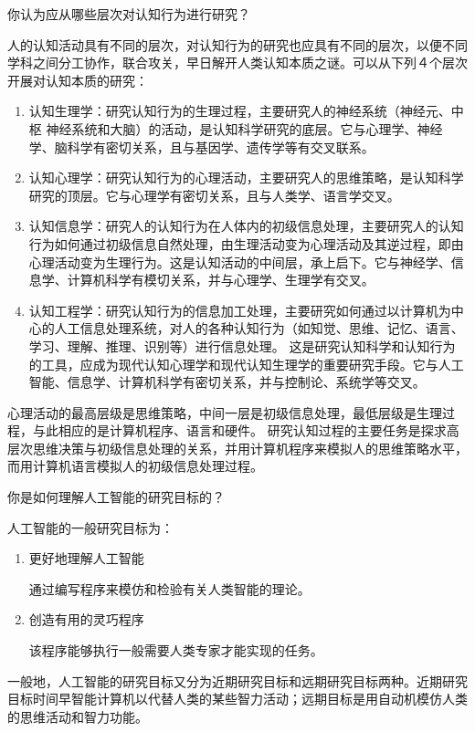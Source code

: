 \begin{question}
你认为应从哪些层次对认知行为进行研究？
\end{question}
\begin{solution}
人的认知活动具有不同的层次，对认知行为的研究也应具有不同的层次，以便不同学科之间分工协作，联合攻关，早日解开人类认知本质之谜。可以从下列４个层次开展对认知本质的研究： 
	\begin{enumerate}
		\item 认知生理学：研究认知行为的生理过程，主要研究人的神经系统（神经元、中枢 神经系统和大脑）的活动，是认知科学研究的底层。它与心理学、神经学、脑科学有密切关系，且与基因学、遗传学等有交叉联系。
		\item 认知心理学：研究认知行为的心理活动，主要研究人的思维策略，是认知科学研究的顶层。它与心理学有密切关系，且与人类学、语言学交叉。
		\item 认知信息学：研究人的认知行为在人体内的初级信息处理，主要研究人的认知行为如何通过初级信息自然处理，由生理活动变为心理活动及其逆过程，即由心理活动变为生理行为。这是认知活动的中间层，承上启下。它与神经学、信息学、计算机科学有模切关系，并与心理学、生理学有交叉。
		\item 认知工程学：研究认知行为的信息加工处理，主要研究如何通过以计算机为中心的人工信息处理系统，对人的各种认知行为（如知觉、思维、记忆、语言、学习、理解、推理、识别等）进行信息处理。 这是研究认知科学和认知行为的工具，应成为现代认知心理学和现代认知生理学的重要研究手段。它与人工智能、信息学、计算机科学有密切关系，并与控制论、系统学等交叉。
	\end{enumerate} \par
心理活动的最高层级是思维策略，中间一层是初级信息处理，最低层级是生理过程，与此相应的是计算机程序、语言和硬件。 研究认知过程的主要任务是探求高层次思维决策与初级信息处理的关系，并用计算机程序来模拟人的思维策略水平，而用计算机语言模拟人的初级信息处理过程。 
\end{solution}

\begin{question}
你是如何理解人工智能的研究目标的？
\end{question}
\begin{solution}
人工智能的一般研究目标为：
	\begin{enumerate}
		\item 更好地理解人工智能 \par
		通过编写程序来模仿和检验有关人类智能的理论。
		\item 创造有用的灵巧程序 \par 
		该程序能够执行一般需要人类专家才能实现的任务。
	\end{enumerate} \par 
	一般地，人工智能的研究目标又分为近期研究目标和远期研究目标两种。近期研究目标时间早智能计算机以代替人类的某些智力活动；远期目标是用自动机模仿人类的思维活动和智力功能。
\end{solution}

